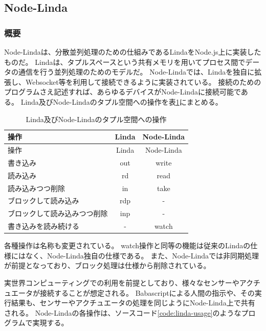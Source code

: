 \subsection{Node-Linda}\label{node-linda}

\subsubsection{概要}\label{ux6982ux8981}

Node-Linda\cite{node-linda}は、分散並列処理のための仕組みであるLinda\cite{linda}をNode.js上に実装したものだ。
Lindaは、タプルスペースという共有メモリを用いてプロセス間でデータの通信を行う並列処理のためのモデルだ。
Node-Lindaでは、Lindaを独自に拡張し、Websocket等を利用して接続できるように実装されている。
接続のためのプログラムさえ記述すれば、あらゆるデバイスがNode-Lindaに接続可能である。
Linda及びNode-Lindaのタプル空間への操作を表\ref{table:tuple-management}にまとめる。

\begin{longtable}[c]{@{}lcc@{}}
\caption{Linda及びNode-Lindaのタプル空間への操作
\label{table:tuple-management}}\tabularnewline
\toprule
操作 & Linda & Node-Linda\tabularnewline
\midrule
\endfirsthead
\toprule
操作 & Linda & Node-Linda\tabularnewline
\midrule
\endhead
書き込み & out & write\tabularnewline
読み込み & rd & read\tabularnewline
読み込みつつ削除 & in & take\tabularnewline
ブロックして読み込み & rdp & -\tabularnewline
ブロックして読み込みつつ削除 & inp & -\tabularnewline
書き込みを読み続ける & - & watch\tabularnewline
\bottomrule
\end{longtable}

各種操作は名称も変更されている。
watch操作と同等の機能は従来のLindaの仕様にはなく、Node-Linda独自の仕様である。
また、Node-Lindaでは非同期処理が前提となっており、ブロック処理は仕様から削除されている。

実世界コンピューティングでの利用を前提としており、様々なセンサーやアクチュエータが接続することが想定される。
Babascriptによる人間の指示や、その実行結果も、センサーやアクチュエータの処理を同じようにNode-Linda上で共有される。
Node-Lindaの各操作は、ソースコード\ref{code:linda-usage}のようなプログラムで実現する。

